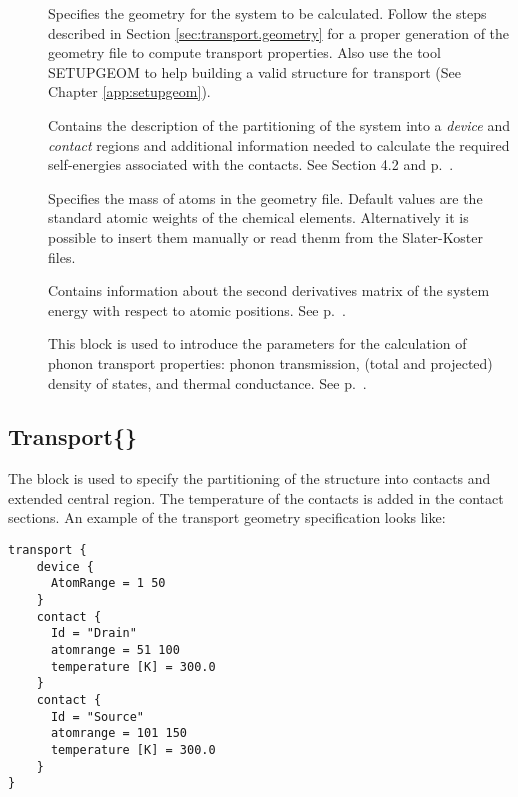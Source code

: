 \begin{description}
\item[] Specifies the geometry for the system to be calculated. 
	Follow the steps described in Section \ref{sec:transport.geometry} for a proper generation 
	of the geometry file to compute transport properties. Also use the tool SETUPGEOM to help
	building a valid structure for transport (See Chapter \ref{app:setupgeom}).
\item[] Contains the description of the partitioning of the system into a 
	{\em device} and {\em contact} regions and additional information needed to calculate the 
	required self-energies associated with the contacts. 
	See Section 4.2 and p.~.
\item[]  Specifies the mass of atoms in the geometry file. 
	Default values are the standard atomic weights of the chemical elements. Alternatively
	it is possible to insert them manually or read thenm from the Slater-Koster files.
\item[] Contains information about the second derivatives matrix of the system energy 
	with respect to atomic positions. See  p.~.
\item[] This block is used to introduce the parameters for the calculation of 
	phonon transport properties: phonon transmission, (total and projected) density of states, 
	and thermal conductance. See  p.~.
\end{description}

\subsection{Transport\{\}}
\label{sec:phonon.Transport}

The block  is used to specify the partitioning of the structure into contacts and 
extended central region. 
The temperature of the contacts is added in the contact sections. An example of the transport 
geometry specification looks like:

\begin{verbatim}
transport {
    device {
      AtomRange = 1 50
    }
    contact {
      Id = "Drain"
      atomrange = 51 100
      temperature [K] = 300.0
    }
    contact {
      Id = "Source"
      atomrange = 101 150
      temperature [K] = 300.0
    }
}
\end{verbatim}



